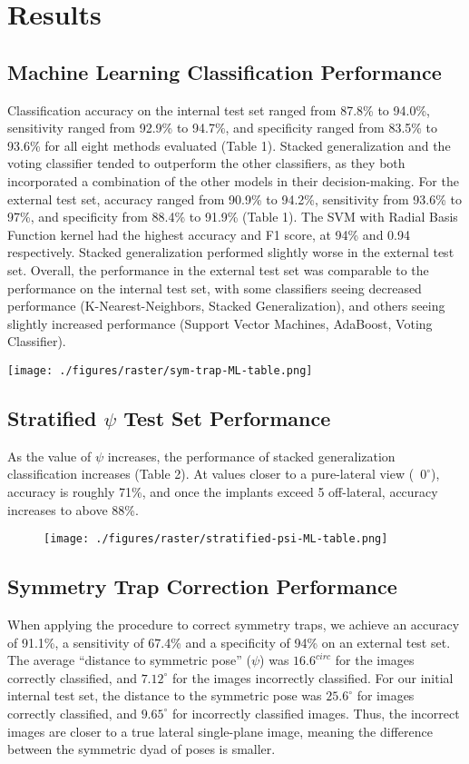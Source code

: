 \section{Results}
\subsection{Machine Learning Classification Performance}
Classification accuracy on the internal test set ranged from 87.8\% to 94.0\%, sensitivity ranged from 92.9\% to 94.7\%, and specificity ranged from 83.5\% to 93.6\% for all eight methods evaluated (Table 1).
Stacked generalization and the voting classifier tended to outperform the other classifiers, as they both incorporated a combination of the other models in their decision-making.
For the external test set, accuracy ranged from 90.9\% to 94.2\%, sensitivity from 93.6\% to 97\%, and specificity from 88.4\% to 91.9\%  (Table 1).
The SVM with Radial Basis Function kernel had the highest accuracy and F1 score, at 94\% and 0.94 respectively. Stacked generalization performed slightly worse in the external test set.
Overall, the performance in the external test set was comparable to the performance on the internal test set, with some classifiers seeing decreased performance (K-Nearest-Neighbors, Stacked Generalization), and others seeing slightly increased performance (Support Vector Machines, AdaBoost, Voting Classifier).

\begin{table}
	\centering
	\texttt{[image: ./figures/raster/sym-trap-ML-table.png]}
\end{table}

\subsection{Stratified $\psi$ Test Set Performance}
As the value of $\psi$ increases, the performance of stacked generalization classification increases (Table 2).
At values closer to a pure-lateral view (~$0^{\circ}$), accuracy is roughly 71\%, and once the implants exceed 5 off-lateral, accuracy increases to above 88\%.

\begin{figure}
	\centering
	\texttt{[image: ./figures/raster/stratified-psi-ML-table.png]}
\end{figure}

\subsection{Symmetry Trap Correction Performance}
When applying the procedure to correct symmetry traps, we achieve an accuracy of 91.1\%, a sensitivity of 67.4\% and a specificity of 94\% on an external test set.
The average “distance to symmetric pose” ($\psi$) was $16.6^{circ}$ for the images correctly classified, and $7.12^{\circ}$ for the images incorrectly classified.
For our initial internal test set, the distance to the symmetric pose was $25.6^{\circ}$ for images correctly classified, and $9.65^{\circ}$ for incorrectly classified images.
Thus, the incorrect images are closer to a true lateral single-plane image, meaning the difference between the symmetric dyad of poses is smaller.

